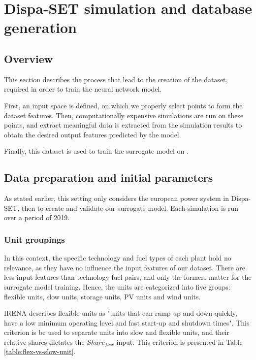 \section{Dispa-SET simulation and database generation}

\subsection{Overview}

This section describes the process that lead to the creation of the dataset, required in order to train the neural network model.

First, an input space is defined, on which we properly select points to form the dataset features. Then, computationally expensive simulations are run on these points, and extract meaningful data is extracted from the simulation results to obtain the desired output features predicted by the model.

Finally, this dataset is used to train the surrogate model on \cite{surrogate_model_dev}.

\subsection{Data preparation and initial parameters}

As stated earlier, this setting only considers the european power system in Dispa-SET, then to create and validate our surrogate model. Each simulation is run over a period of 2019.

\subsubsection{Unit groupings}
In this context, the specific technology and fuel types of each plant hold no relevance, as they have no influence the input features of our dataset. There are less input features than technology-fuel pairs, and only the formers matter for the surrogate model training. Hence, the units are categorized into five groups: flexible units, slow units, storage units, PV units and wind units.

IRENA \cite{irena} describes flexible units as "units that can ramp up and down quickly, have a low minimum operating level and fast start-up and shutdown times". This criterion is be used to separate units into slow and flexible units, and their relative shares dictates the $Share_{flex}$ input. This criterion is presented in Table \ref{table:flex-vs-slow-unit}.

